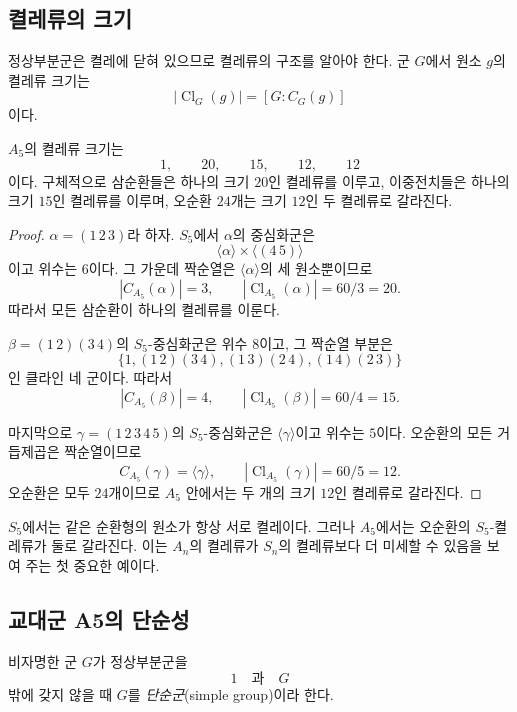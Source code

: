 \subsection{켤레류의 크기}

정상부분군은 켤레에 닫혀 있으므로 켤레류의 구조를 알아야 한다. 군 $G$에서 원소 $g$의 켤레류 크기는
\[
  |\operatorname{Cl}_G(g)|=[G:C_G(g)]
\]
이다.

\begin{proposition}[$A_5$의 켤레류]
\label{prop:a5-conjugacy-classes}
$A_5$의 켤레류 크기는
\[
  1,\qquad 20,\qquad 15,\qquad 12,\qquad 12
\]
이다. 구체적으로 삼순환들은 하나의 크기 $20$인 켤레류를 이루고, 이중전치들은 하나의 크기 $15$인 켤레류를 이루며, 오순환 $24$개는 크기 $12$인 두 켤레류로 갈라진다.
\end{proposition}

\begin{proof}
$\alpha=(1\,2\,3)$라 하자. $S_5$에서 $\alpha$의 중심화군은
\[
  \langle\alpha\rangle\times\langle(4\,5)\rangle
\]
이고 위수는 $6$이다. 그 가운데 짝순열은 $\langle\alpha\rangle$의 세 원소뿐이므로
\[
  |C_{A_5}(\alpha)|=3,
  \qquad
  |\operatorname{Cl}_{A_5}(\alpha)|=60/3=20.
\]
따라서 모든 삼순환이 하나의 켤레류를 이룬다.

$\beta=(1\,2)(3\,4)$의 $S_5$-중심화군은 위수 $8$이고, 그 짝순열 부분은
\[
  \{1,(1\,2)(3\,4),(1\,3)(2\,4),(1\,4)(2\,3)\}
\]
인 클라인 네 군이다. 따라서
\[
  |C_{A_5}(\beta)|=4,
  \qquad
  |\operatorname{Cl}_{A_5}(\beta)|=60/4=15.
\]

마지막으로 $\gamma=(1\,2\,3\,4\,5)$의 $S_5$-중심화군은 $\langle\gamma\rangle$이고 위수는 $5$이다. 오순환의 모든 거듭제곱은 짝순열이므로
\[
  C_{A_5}(\gamma)=\langle\gamma\rangle,
  \qquad
  |\operatorname{Cl}_{A_5}(\gamma)|=60/5=12.
\]
오순환은 모두 $24$개이므로 $A_5$ 안에서는 두 개의 크기 $12$인 켤레류로 갈라진다.
\end{proof}

\begin{remark}
$S_5$에서는 같은 순환형의 원소가 항상 서로 켤레이다. 그러나 $A_5$에서는 오순환의 $S_5$-켤레류가 둘로 갈라진다. 이는 $A_n$의 켤레류가 $S_n$의 켤레류보다 더 미세할 수 있음을 보여 주는 첫 중요한 예이다.
\end{remark}

\subsection{교대군 A5의 단순성}

\begin{definition}[단순군]
비자명한 군 $G$가 정상부분군을
\[
  1\quad\text{과}\quad G
\]
밖에 갖지 않을 때 $G$를 \emph{단순군}(simple group)이라 한다.
\end{definition}

